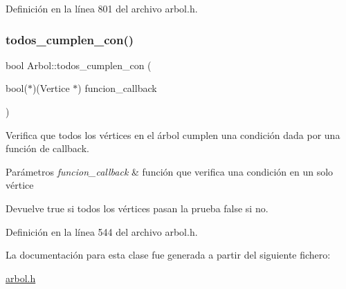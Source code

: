 Definición en la línea 801 del archivo arbol.\+h.

\mbox{\label{classArbol_aba4b09fef18152beb43e04fee7394f34}} 
\subsubsection{\texorpdfstring{todos\+\_\+cumplen\+\_\+con()}{todos\_cumplen\_con()}}
{\footnotesize\ttfamily bool Arbol\+::todos\+\_\+cumplen\+\_\+con (\begin{DoxyParamCaption}\item[{bool($\ast$)(Vertice $\ast$)}]{funcion\+\_\+callback }\end{DoxyParamCaption})\hspace{0.3cm}{\ttfamily [protected]}}



Verifica que todos los vértices en el árbol cumplen una condición dada por una función de callback. 


\begin{DoxyParams}{Parámetros}
{\em funcion\+\_\+callback} & función que verifica una condición en un solo vértice \\
\hline
\end{DoxyParams}
\begin{DoxyReturn}{Devuelve}
true si todos los vértices pasan la prueba false si no. 
\end{DoxyReturn}


Definición en la línea 544 del archivo arbol.\+h.



La documentación para esta clase fue generada a partir del siguiente fichero\+:\begin{DoxyCompactItemize}
\item 
\hyperlink{arbol_8h}{arbol.\+h}\end{DoxyCompactItemize}
